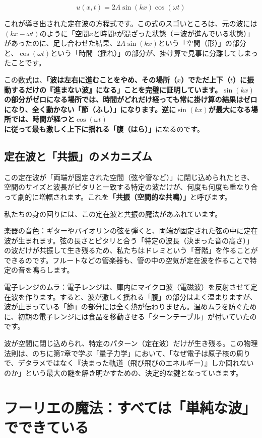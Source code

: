 \[u(x,t) = 2A \sin(kx) \cos(\omega t)\]

これが導き出された定在波の方程式です。この式のスゴいところは、元の波には\((kx - \omega t)\)のように「空間\(x\)と時間\(t\)が混ざった状態（＝波が進んでいる状態）」があったのに、足し合わせた結果、\(2A \sin(kx)\)という「空間（形）」の部分と、\(\cos(\omega t)\)という「時間（揺れ）」の部分が、掛け算で見事に分離してしまったことです。

この数式は、\textbf{「波は左右に進むことをやめ、その場所（\(x\)）でただ上下（\(t\)）に振動するだけの『進まない波』になる」ことを完璧に証明しています。\(\sin(kx)\)の部分がゼロになる場所では、時間がどれだけ経っても常に掛け算の結果はゼロになり、全く動かない「節（ふし）」になります。逆に\(\sin(kx)\)が最大になる場所では、時間が経つと\(\cos(\omega t)\)に従って最も激しく上下に揺れる「腹（はら）」}になるのです。

\subsection{定在波と「共振」のメカニズム}

この定在波が「両端が固定された空間（弦や管など）」に閉じ込められたとき、空間のサイズと波長がピタリと一致する特定の波だけが、何度も何度も重なり合って劇的に増幅されます。これを\textbf{「共振（空間的な共鳴）」}と呼びます。

私たちの身の回りには、この定在波と共振の魔法があふれています。

楽器の音色：ギターやバイオリンの弦を弾くと、両端が固定された弦の中に定在波が生まれます。弦の長さとピタリと合う「特定の波長（決まった音の高さ）」の波だけが共振して生き残るため、私たちはドレミという「音階」を作ることができるのです。フルートなどの管楽器も、管の中の空気が定在波を作ることで特定の音を鳴らします。

電子レンジのムラ：電子レンジは、庫内にマイクロ波（電磁波）を反射させて定在波を作ります。すると、波が激しく揺れる「腹」の部分はよく温まりますが、波が止まっている「節」の部分には全く熱が伝わりません。温めムラを防ぐために、初期の電子レンジには食品を移動させる「ターンテーブル」が付いていたのです。

波が空間に閉じ込められ、特定のパターン（定在波）だけが生き残る。この物理法則は、のちに第7章で学ぶ「量子力学」において、「なぜ電子は原子核の周りで、デタラメではなく『決まった軌道（飛び飛びのエネルギー）』しか回れないのか」という最大の謎を解き明かすための、決定的な鍵となっていきます。

\section{フーリエの魔法：すべては「単純な波」でできている}

